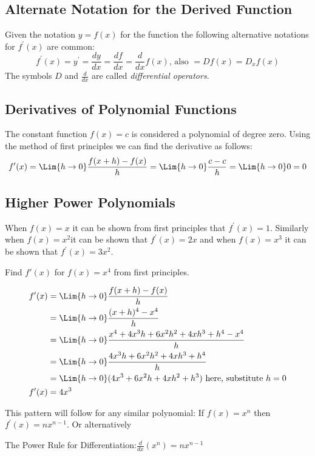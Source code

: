\subsection*{Alternate Notation for the Derived Function}
Given the notation $y =f (x)$ for the function the following alternative notations for $f^{ \prime } \left (x\right )$ are common: 
$$f^{ \prime } (x) =y^{ \prime } =\frac{d y}{d x} =\frac{d f}{d x} =\frac{d}{d x} f (x) \text{, also } =D f (x) =D_{x} f (x)$$
The symbols $D$ and $\frac{d}{d x}$ are called \textit{differential operators.} 

\subsection*{Derivatives of Polynomial Functions}
The constant function $f (x) =c$ is considered a polynomial of degree zero. Using the method of first principles we can find the derivative as follows: 
$$f^{ \prime } (x) =\Lim{h\to 0}\frac{f (x +h) -f (x)}{h} =\Lim{h\to 0}\frac{c -c}{h} =\Lim{h\to 0}0 =0$$

\subsection*{Higher Power Polynomials}
When $f (x) =x$ it can be shown from first principles that $f^{ \prime } (x) =1$. Similarly when $f (x) =x^{2\text{}}$it can be shown that $f^{ \prime } (x) =2 x$ and when $f (x) =x^{3}$ it can be shown that $f^{ \prime } (x) =3 x^{2}$. 

\example Find $f'(x)$ for $f (x) =x^{4}$ from first principles.

\solution \begin{align*}f^{ \prime } (x) &  = \Lim{h\to 0}\frac{f (x +h) -f (x)}{h} \\
 &  = \Lim{h\to 0}\frac{(x +h)^{4} -x^{4}}{h} \\
 &  = \Lim{h\to 0}\frac{x^{4} +4 x^{3} h +6 x^{2} h^{2} +4 x h^{3} +h^{4} -x^{4}}{h} \\
 &  = \Lim{h\to 0}\frac{4 x^{3} h +6 x^{2} h^{2} +4 x h^{3} +h^{4}}{h} \\
 &  = \Lim{h\to 0}(4 x^{3} +6 x^{2} h +4 x h^{2} +h^{3})\text{ here, substitute }h=0 \\
 f'(x)&  = 4 x^{3}\end{align*}

This pattern will follow for any similar polynomial: If $f (x) =x^{n}$ then $f^{ \prime } (x) =n x^{n -1}$. Or alternatively 
\begin{tcolorbox}
The Power Rule for Differentiation:\qquad$\displaystyle \frac{d}{d x} (x^{n}) =n x^{n -1}$
\end{tcolorbox}
	
